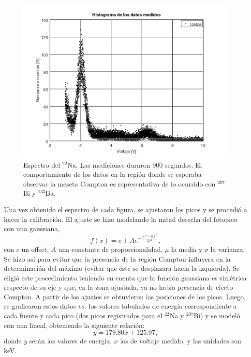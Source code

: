 \documentclass[twoside]{article}
\begin{document}
\begin{multicols}{2}
\begin{figure}[H]
    \centering
    \includegraphics[scale=0.4]{sodio.png}
    \caption{Espectro del $^{22}$Na. Las mediciones duraron 900 segundos. El comportamiento de los datos en la región donde se esperaba observar la meseta Compton es representativa de lo ocurrido con $^{207}$Bi y $^{133}$Ba.}
    \label{sodio}
\end{figure}


Una vez obtenido el espectro de cada figura, se ajustaron los picos y se procedió a hacer la calibración. El ajuste se hizo modelando la mitad derecha del fotopico con una gaussiana,
\begin{equation}
    f(x) =  c + A e^{-\frac{(x - \mu)^2}{2\sigma^2}},
\end{equation}
con $c$ un offset, $A$ una constante de proporcionalidad, $\mu$ la media y $\sigma$ la varianza. Se hizo así para evitar que la presencia de la región Compton influyera en la determinación del máximo (evitar que éste se desplazara hacia la izquierda). Se eligió este procedimiento teniendo en cuenta que la función gaussiana es simétrica respecto de su eje y que, en la zona ajustada, ya no había presencia de efecto Compton. A partir de los ajustes se obtuvieron las posiciones de los picos. Luego, se graficaron estos datos $vs.$ los valores tabulados de energía correspondiente a cada fuente y cada pico (dos picos registrados para el $^{22}$Na y $^{207}$Bi) y se modeló con una lineal, obteniendo la siguiente relación: 
\begin{equation}
    y = 179.80 x + 125.97,
\end{equation}
donde $y$ serán los valores de energía, $x$ los de voltaje medido, y las unidades son keV. 



\end{multicols}
\end{document}
